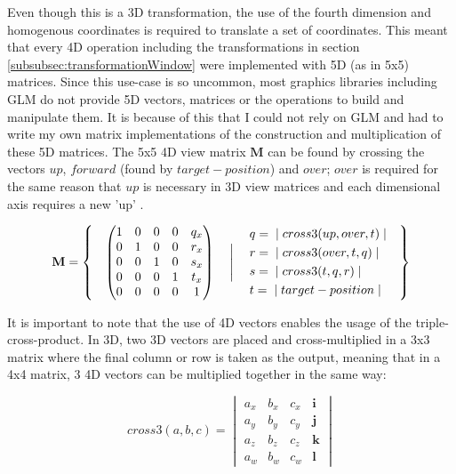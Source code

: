\documentclass[11pt, a4paper]{article}
\begin{document}
Even though this is a 3D transformation, the use of the fourth dimension and homogenous coordinates is required to translate a set of coordinates. This meant that every 4D operation including the transformations in section \ref{subsubsec:transformationWindow} were implemented with 5D (as in 5x5) matrices. Since this use-case is so uncommon, most graphics libraries including GLM do not provide 5D vectors, matrices or the operations to build and manipulate them. It is because of this that I could not rely on GLM and had to write my own matrix implementations of the construction and multiplication of these 5D matrices. The 5x5 4D view matrix $\textbf{M}$ can be found by crossing the vectors $up$, $forward$ (found by $target - position$) and $over$; $over$ is required for the same reason that $up$ is necessary in 3D view matrices and each dimensional axis requires a new 'up' \parencite[\texttt{CameraND.h}]{truengine}.

\begin{equation*}
  \textbf{M} =
  \left\{\quad
  \begin{pmatrix}
  1 & 0 & 0 & 0 & q_x \\
  0 & 1 & 0 & 0 & r_x \\
  0 & 0 & 1 & 0 & s_x \\
  0 & 0 & 0 & 1 & t_x \\
  0 & 0 & 0 & 0 & 1
  \end{pmatrix}
  \quad \Biggm{|} \quad
  \begin{aligned}
    & q = \;|\; cross3(up, over, t) \;| \\
    & r = \;|\; cross3(over, t, q) \;| \\
    & s = \;|\; cross3(t, q, r) \;| \\
    & t = \;|\; target - position \;|
  \end{aligned}
  \quad\right\}
\end{equation*}

It is important to note that the use of 4D vectors enables the usage of the triple-cross-product. In 3D, two 3D vectors are placed and cross-multiplied in a 3x3 matrix where the final column or row is taken as the output, meaning that in a 4x4 matrix, 3 4D vectors can be multiplied together in the same way:

\begin{equation*}
  cross3(a, b, c) =
  \begin{vmatrix}
  a_x & b_x & c_x & \textbf{i} \\
  a_y & b_y & c_y & \textbf{j} \\
  a_z & b_z & c_z & \textbf{k} \\
  a_w & b_w & c_w & \textbf{l}
  \end{vmatrix}
\end{equation*}
\end{document}
